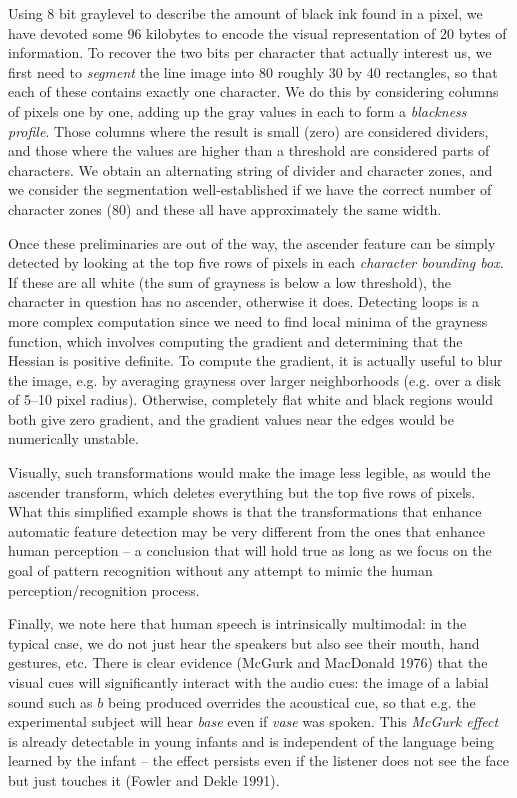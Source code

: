 Using 8 bit graylevel to describe the amount of black ink found in a pixel, we
have devoted some 96 kilobytes to encode the visual representation of 20 bytes
of information. To recover the two bits per character that actually interest
us, we first need to {\it segment} the line image into 80 roughly 30 by 40
rectangles, so that each of these contains exactly one character. We do this
by considering columns of pixels one by one, adding up the gray values in each
to form a {\it blackness profile}. Those columns where the result is small
(zero) are considered dividers, and those where the values are higher than a
threshold are considered parts of characters. We obtain an alternating string
of divider and character zones, and we consider the segmentation
well-established if we have the correct number of character zones (80) and
these all have approximately the same width. 

Once these preliminaries are out of the way, the ascender feature can be
simply detected by looking at the top five rows of pixels in each {\it
  character bounding box}. If these are all white (the sum of grayness is
below a low threshold), the character in question has no ascender, otherwise
it does. Detecting loops is a more complex computation since we need to find
local minima of the grayness function, which involves computing the gradient
and determining that the Hessian is positive definite.  To compute the
gradient, it is actually useful to blur the image, e.g. by averaging grayness
over larger neighborhoods (e.g. over a disk of 5--10 pixel radius). Otherwise,
completely flat white and black regions would both give zero gradient, and the
gradient values near the edges would be numerically unstable.

Visually, such transformations would make the image less legible, as would the
ascender transform, which deletes everything but the top five rows of pixels.
What this simplified example shows is that the transformations that enhance
automatic feature detection may be very different from the ones that enhance
human perception -- a conclusion that will hold true as long as we focus on
the goal of pattern recognition without any attempt to mimic the human
perception/recognition process.

Finally, we note here that human speech is intrinsically multimodal: in the
typical case, we do not just hear the speakers but also see their mouth, hand
gestures, etc. There is clear evidence (McGurk and MacDonald 1976) that the
visual cues will significantly interact with the audio cues: the image of a
labial sound such as $b$ being produced overrides the acoustical cue, so that
e.g.  the experimental subject will hear {\it base} even if {\it vase} was
spoken. This {\it McGurk effect} is already detectable in
young infants and is independent of the language being learned by the infant
-- the effect persists even if the listener does not see the face but just
touches it (Fowler and Dekle 1991).\nocite{McGurk:1976}\nocite{Fowler:1991}

